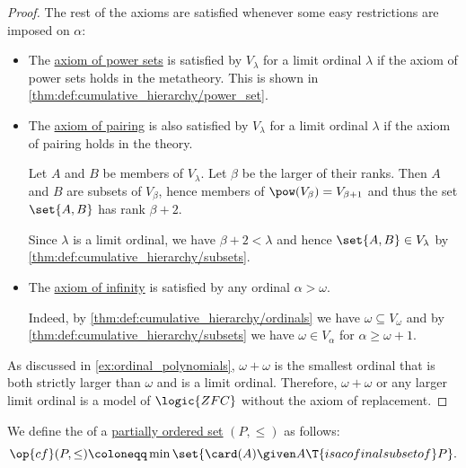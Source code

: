 \begin{proof}
  The rest of the axioms are satisfied whenever some easy restrictions are imposed on \( \alpha \):
  \begin{itemize}
    \item The \hyperref[def:zfc/power_set]{axiom of power sets} is satisfied by \( V_\lambda \) for a limit ordinal \( \lambda \) if the axiom of power sets holds in the metatheory. This is shown in \cref{thm:def:cumulative_hierarchy/power_set}.

    \item The \hyperref[def:zfc/pairing]{axiom of pairing} is also satisfied by \( V_\lambda \) for a limit ordinal \( \lambda \) if the axiom of pairing holds in the theory.

    Let \( A \) and \( B \) be members of \( V_\lambda \). Let \( \beta \) be the larger of their ranks. Then \( A \) and \( B \) are subsets of \( V_\beta \), hence members of \( \pow(V_\beta) = V_{\beta + 1} \) and thus the set \( \set{ A, B } \) has rank \( \beta + 2 \).

    Since \( \lambda \) is a limit ordinal, we have \( \beta + 2 < \lambda \) and hence \( \set{ A, B } \in V_\lambda \) by \cref{thm:def:cumulative_hierarchy/subsets}.

    \item The \hyperref[def:zfc/infinity]{axiom of infinity} is satisfied by any ordinal \( \alpha > \omega \).

    Indeed, by \cref{thm:def:cumulative_hierarchy/ordinals} we have \( \omega \subseteq V_\omega \) and by \cref{thm:def:cumulative_hierarchy/subsets} we have \( \omega \in V_\alpha \) for \( \alpha \geq \omega + 1 \).
  \end{itemize}

  As discussed in \cref{ex:ordinal_polynomials}, \( \omega + \omega \) is the smallest ordinal that is both strictly larger than \( \omega \) and is a limit ordinal. Therefore, \( \omega + \omega \) or any larger limit ordinal is a model of \( \logic{ZFC} \) without the axiom of replacement.
\end{proof}

\begin{definition}\label{def:cofinality}
  We define the  of a \hyperref[def:partially_ordered_set]{partially ordered set} \( (P, \leq) \) as follows:
  \begin{equation*}
     \op{cf}(P, \leq) \coloneqq \min\set{ \card(A) \given A \T{is a cofinal subset of} P }.
  \end{equation*}
\end{definition}

